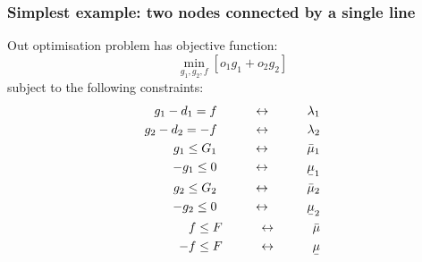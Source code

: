 \documentclass[10pt,aspectratio=169,dvipsnames]{beamer}
\def\l{\lambda}
\def\m{\mu}
\newcommand{\ubar}[1]{\text{\b{$#1$}}}
\begin{document}
\begin{frame}[fragile]
  \frametitle{Simplest example: two nodes connected by a single line}

  Out optimisation problem has objective function:
  \begin{equation*}
    \min_{g_1,g_2,f}  \left[o_1 g_1 + o_2 g_2 \right]
  \end{equation*}
  subject to the following constraints:
  \begin{align*}
    g_1 - d_1  = f \hspace{1cm}\leftrightarrow\hspace{1cm} \l_1 \\
    g_2 - d_2  = -f \hspace{1cm}\leftrightarrow\hspace{1cm} \l_2 \\
  g_1 \leq G_1  \hspace{1cm}\leftrightarrow\hspace{1cm} \bar{\m}_1 \\
    - g_1 \leq 0  \hspace{1cm}\leftrightarrow\hspace{1cm} \ubar{\m}_1  \\
  g_2 \leq G_2  \hspace{1cm}\leftrightarrow\hspace{1cm} \bar{\m}_2  \\
  - g_2 \leq 0  \hspace{1cm}\leftrightarrow\hspace{1cm} \ubar{\m}_2  \\
    f \leq F  \hspace{1cm}\leftrightarrow\hspace{1cm} \bar{\m}  \\
    - f \leq F  \hspace{1cm}\leftrightarrow\hspace{1cm} \ubar{\m}
\end{align*}
\end{frame}
\end{document}
